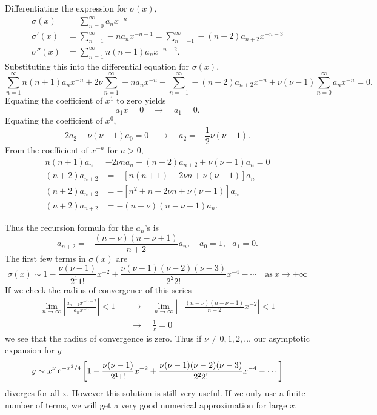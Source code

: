 Differentiating the expression for $\sigma(x)$,
\begin{align*}
  \sigma(x) &= \sum_{n=0}^\infty a_n x^{-n} \\
  \sigma'(x) &= \sum_{n=1}^\infty -n a_n x^{-n-1} 
  = \sum_{n=-1}^\infty -(n+2)a_{n+2} x^{-n-3} \\
  \sigma''(x) &= \sum_{n=1}^\infty n(n+1) a_n x^{-n-2}.
\end{align*}
Substituting this into the differential equation for $\sigma(x)$,
\[      \sum_{n=1}^\infty n(n+1) a_n x^{-n} + 
2\nu \sum_{n=1}^\infty -n a_n x^{-n} - 
\sum_{n=-1}^\infty -(n+2)a_{n+2} x^{-n} + 
\nu(\nu-1) \sum_{n=0}^\infty a_n x^{-n} = 0.
\]
Equating the coefficient of $x^1$ to zero yields
\[ a_1 x = 0\quad \to \quad a_1 = 0. \]
Equating the coefficient of $x^0$,
\[2 a_2 + \nu(\nu-1)a_0 = 0 \quad \to \quad 
a_2 = -\frac{1}{2}\nu(\nu-1).\]
From the coefficient of $x^{-n}$ for $n > 0$,
\begin{align*}
  n(n+1)a_n &- 2\nu n a_n + (n+2)a_{n+2} + \nu(\nu-1)a_n = 0 \\
  (n+2)a_{n+2} &= - [n(n+1) - 2\nu n + \nu(\nu-1)]a_n \\
  (n+2)a_{n+2} &= - [n^2 + n - 2\nu n + \nu(\nu-1)]a_n \\
  (n+2)a_{n+2} &= - (n-\nu)(n-\nu+1)a_n. 
\end{align*}







Thus the recursion formula for the $a_n$'s is
\[a_{n+2} = -\frac{(n-\nu)(n-\nu+1)}{n+2}a_n,\quad a_0 = 1,\ \ \ a_1 = 0. \]
The first few terms in $\sigma(x)$ are
\[\sigma(x) \sim 1 - \frac{\nu(\nu-1)}{2^1 1!}x^{-2} + 
\frac{\nu(\nu-1)(\nu-2)(\nu-3)}{2^2 2!} x^{-4} - \cdots \quad 
\mathrm{as}\ x  \to +\infty\]
If we check the radius of convergence of this series
\begin{align*}
  \lim_{n \to \infty} \left| \frac{a_{n+2} x^{-n-2}}{a_n x^{-n}}\right|<1 \quad
  &\to \quad \lim_{n \to \infty} \left| 
    -\frac{(n-\nu)(n-\nu+1)}{n+2} x^{-2} \right| < 1 \\
  &\to \quad \frac{1}{x} = 0
\end{align*}
we see that the radius of convergence is zero.  Thus if $\nu \neq 0,1,2,\ldots$
our asymptotic expansion for $y$
\[ y \sim x^\nu \mathop{\mathrm{e}}\nolimits^{-x^2/4}\left[1 - \frac{\nu(\nu-1)}{2^1 1!}x^{-2} + 
  \frac{\nu(\nu-1)(\nu-2)(\nu-3)}{2^2 2!} x^{-4} - \cdots\right] \]
diverges for all x.  However this solution is still very useful. 
If we only use a finite number of terms, we will get a very good numerical 
approximation for large $x$.


